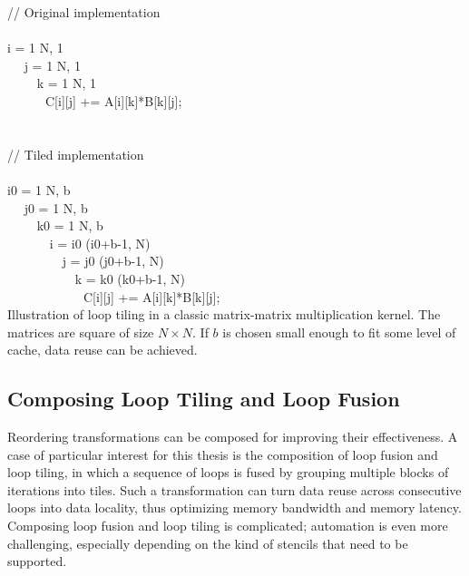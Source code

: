 \begin{algorithm}[t]
\scriptsize\ttfamily
{}

// Original implementation\\
~\\
 i = 1  N, 1\\
~~ j = 1  N, 1\\
~~~~ k = 1  N, 1\\
~~~~~~C[i][j] += A[i][k]*B[k][j];\\

~\\
~\\
// Tiled implementation\\
~\\
 i0 = 1  N, b\\
~~ j0 = 1  N, b\\
~~~~ k0 = 1  N, b\\
~~~~~~ i = i0  (i0+b-1, N)\\
~~~~~~~~ j = j0  (j0+b-1, N)\\
~~~~~~~~~~ k = k0  (k0+b-1, N)\\
~~~~~~~~~~~~C[i][j] += A[i][k]*B[k][j];\\


\caption{Illustration of loop tiling in a classic matrix-matrix multiplication kernel\protect\footnotemark. The matrices are square of size $N \times N$. If $b$ is chosen small enough to fit some level of cache, data reuse can be achieved.}
\label{code:loop-tiling}
\end{algorithm}


\subsection{Composing Loop Tiling and Loop Fusion}
\label{sec:bkg:tiling}
Reordering transformations can be composed for improving their effectiveness. A case of particular interest for this thesis is the composition of loop fusion and loop tiling, in which a sequence of loops is fused by grouping multiple blocks of iterations into tiles. Such a transformation can turn data reuse across consecutive loops into data locality, thus optimizing memory bandwidth and memory latency. Composing loop fusion and loop tiling is complicated; automation is even more challenging, especially depending on the kind of stencils that need to be supported.

